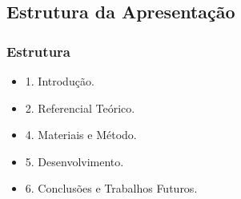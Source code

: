 \subsection{Estrutura da Apresentação}
\begin{frame}
	\frametitle{Estrutura}
	
	\begin{itemize}
	  \item 1. Introdução.
	  \item 2. Referencial Teórico.
	  \item 4. Materiais e Método.
	  \item 5. Desenvolvimento.
	  \item 6. Conclusões e Trabalhos Futuros.
	\end{itemize}
\end{frame}